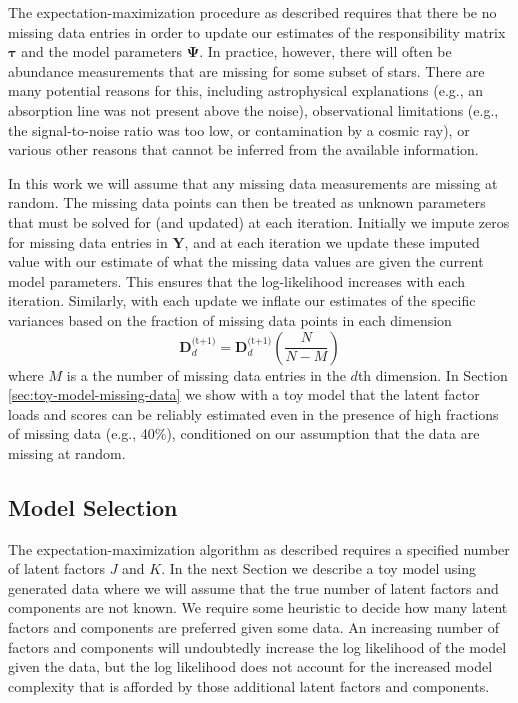\documentclass[twocolumn]{aastex62}
\newcommand{\vect}[1]{\boldsymbol{\mathbf{#1}}}
\renewcommand{\vec}[1]{\vect{#1}}
\newcommand{\data}{\textbf{Y}}
\newcommand{\nextstep}{^\textrm{(t+1)}}
\newcommand{\specificvariance}{\vec{D}}
\newcommand{\NumLatentFactors}{J}
\newcommand{\NumComponents}{K}
\begin{document}
The expectation-maximization procedure as described requires that there be no 
missing data entries in order to update our estimates of the responsibility matrix $\vec\tau$
and the model parameters $\vec\Psi$.
In practice, however, there will often be abundance measurements that are missing
for some subset of stars. There are many potential reasons for this, including
astrophysical explanations (e.g., an absorption line was not present above the noise),
observational limitations (e.g., the signal-to-noise ratio was too low, or 
contamination by a cosmic ray), or various other reasons that cannot be inferred
from the available information.

In this work we will assume that any missing data measurements are
missing at random. The missing data points can then be treated as unknown
parameters that must be solved for (and updated) at each iteration. Initially
we impute zeros for missing data entries in $\vec\data$, and at each iteration we update
these imputed value with our estimate of what the missing data values
are given the current model parameters. This ensures that the log-likelihood increases
with each iteration. Similarly, with each update we inflate
our estimates of the specific variances based on the fraction of missing
data points in each dimension
\begin{equation}
\specificvariance_d\nextstep = \specificvariance_d\nextstep\left(\frac{N}{N-M}\right)
\end{equation}
\noindent{}where $M$ is a the number of missing data entries in the $d$th dimension.
In Section \ref{sec:toy-model-missing-data} we show with a toy model that the latent
factor loads and scores can be reliably estimated even in the presence of high fractions
of missing data (e.g., 40\%), conditioned on our assumption that the data are missing
at random.





\subsection{Model Selection}

The expectation-maximization algorithm as described requires a specified 
number of latent factors $\NumLatentFactors$ and $\NumComponents$. In the next 
Section we describe a toy model using generated data where we will assume
that the true number of latent factors and components are not known. 
We require some heuristic to decide how many latent factors and components are 
preferred given some data. An increasing number of factors
and components will undoubtedly increase the log likelihood of the model given
the data, but the log likelihood does not account for the increased model 
complexity that is afforded by those additional latent factors and components.
\end{document}
